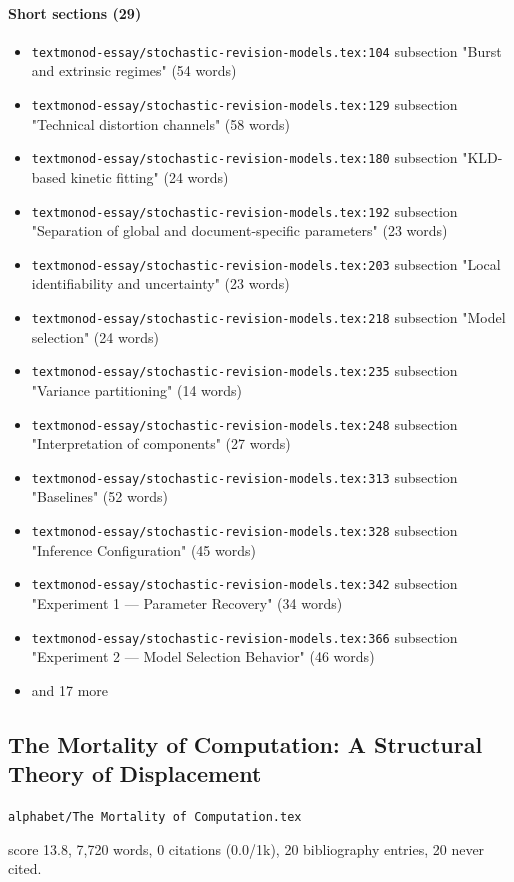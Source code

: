 \documentclass[11pt]{article}
\newcommand{\loc}[1]{{\small\color{muted}\texttt{#1}}}
\begin{document}
\paragraph{Short sections (29)}
\begin{itemize}
\item \loc{textmonod-essay/\allowbreak{}stochastic-revision-models.tex:104} subsection "Burst and extrinsic regimes" (54 words)
\item \loc{textmonod-essay/\allowbreak{}stochastic-revision-models.tex:129} subsection "Technical distortion channels" (58 words)
\item \loc{textmonod-essay/\allowbreak{}stochastic-revision-models.tex:180} subsection "KLD-based kinetic fitting" (24 words)
\item \loc{textmonod-essay/\allowbreak{}stochastic-revision-models.tex:192} subsection "Separation of global and document-specific parameters" (23 words)
\item \loc{textmonod-essay/\allowbreak{}stochastic-revision-models.tex:203} subsection "Local identifiability and uncertainty" (23 words)
\item \loc{textmonod-essay/\allowbreak{}stochastic-revision-models.tex:218} subsection "Model selection" (24 words)
\item \loc{textmonod-essay/\allowbreak{}stochastic-revision-models.tex:235} subsection "Variance partitioning" (14 words)
\item \loc{textmonod-essay/\allowbreak{}stochastic-revision-models.tex:248} subsection "Interpretation of components" (27 words)
\item \loc{textmonod-essay/\allowbreak{}stochastic-revision-models.tex:313} subsection "Baselines" (52 words)
\item \loc{textmonod-essay/\allowbreak{}stochastic-revision-models.tex:328} subsection "Inference Configuration" (45 words)
\item \loc{textmonod-essay/\allowbreak{}stochastic-revision-models.tex:342} subsection "Experiment 1 --- Parameter Recovery" (34 words)
\item \loc{textmonod-essay/\allowbreak{}stochastic-revision-models.tex:366} subsection "Experiment 2 --- Model Selection Behavior" (46 words)
\item[] {\color{muted}\small and 17 more}
\end{itemize}
\subsection{The Mortality of Computation: A Structural Theory of Displacement}
\loc{alphabet/\allowbreak{}The Mortality of Computation.tex}\par
score 13.8, 7,720 words, 0 citations (0.0/1k), 20 bibliography entries, 20 never cited.
\end{document}
